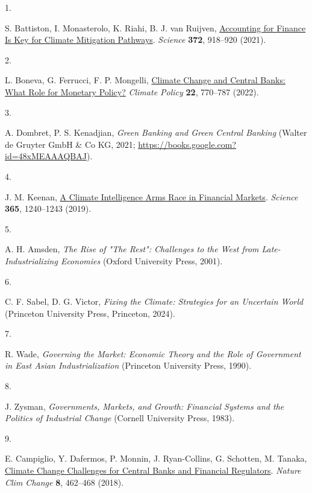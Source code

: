 \documentclass[
  12pt,
  letterpaper,
]{article}
\newlength{\cslhangindent}
\newlength{\csllabelwidth}
\newenvironment{CSLReferences}[2] %
 {\begin{list}{}{%
  \setlength{\itemindent}{0pt}
  \setlength{\leftmargin}{0pt}
  \setlength{\parsep}{0pt}
  \ifodd #1
   \setlength{\leftmargin}{\cslhangindent}
   \setlength{\itemindent}{-1\cslhangindent}
  \fi
  \setlength{\itemsep}{#2\baselineskip}}}
 {\end{list}}
\newcommand{\CSLLeftMargin}[1]{\parbox[t]{\csllabelwidth}{\strut#1\strut}}
\newcommand{\CSLRightInline}[1]{\parbox[t]{\linewidth - \csllabelwidth}{\strut#1\strut}}
\begin{document}
\protect{}\label{refs}
\begin{CSLReferences}{0}{1}
\CSLLeftMargin{1. }%
\CSLRightInline{S. Battiston, I. Monasterolo, K. Riahi, B. J. van
Ruijven, \href{https://doi.org/10.1126/science.abf3877}{Accounting for
{Finance Is Key} for {Climate Mitigation Pathways}}. \emph{Science}
\textbf{372}, 918--920 (2021).}

\CSLLeftMargin{2. }%
\CSLRightInline{L. Boneva, G. Ferrucci, F. P. Mongelli,
\href{https://doi.org/10.1080/14693062.2022.2070119}{Climate {Change}
and {Central Banks}: {What Role} for {Monetary Policy}?} \emph{Climate
Policy} \textbf{22}, 770--787 (2022).}

\CSLLeftMargin{3. }%
\CSLRightInline{A. Dombret, P. S. Kenadjian, \emph{Green {Banking} and
{Green Central Banking}} (Walter de Gruyter GmbH \& Co KG, 2021;
\url{https://books.google.com?id=48xMEAAAQBAJ}).}

\CSLLeftMargin{4. }%
\CSLRightInline{J. M. Keenan,
\href{https://doi.org/10.1126/science.aay8442}{A {Climate Intelligence
Arms Race} in {Financial Markets}}. \emph{Science} \textbf{365},
1240--1243 (2019).}

\CSLLeftMargin{5. }%
\CSLRightInline{A. H. Amsden, \emph{The {Rise} of "{The Rest}":
{Challenges} to the {West} from {Late-Industrializing Economies}}
(Oxford University Press, 2001).}

\CSLLeftMargin{6. }%
\CSLRightInline{C. F. Sabel, D. G. Victor, \emph{Fixing the {Climate}:
{Strategies} for an {Uncertain World}} (Princeton University Press,
Princeton, 2024).}

\CSLLeftMargin{7. }%
\CSLRightInline{R. Wade, \emph{Governing the {Market}: {Economic Theory}
and the {Role} of {Government} in {East Asian Industrialization}}
(Princeton University Press, 1990).}

\CSLLeftMargin{8. }%
\CSLRightInline{J. Zysman, \emph{Governments, {Markets}, and {Growth}:
{Financial Systems} and the {Politics} of {Industrial Change}} (Cornell
University Press, 1983).}

\CSLLeftMargin{9. }%
\CSLRightInline{E. Campiglio, Y. Dafermos, P. Monnin, J. Ryan-Collins,
G. Schotten, M. Tanaka,
\href{https://doi.org/10.1038/s41558-018-0175-0}{Climate {Change
Challenges} for {Central Banks} and {Financial Regulators}}.
\emph{Nature Clim Change} \textbf{8}, 462--468 (2018).}


\end{CSLReferences}
\end{document}
